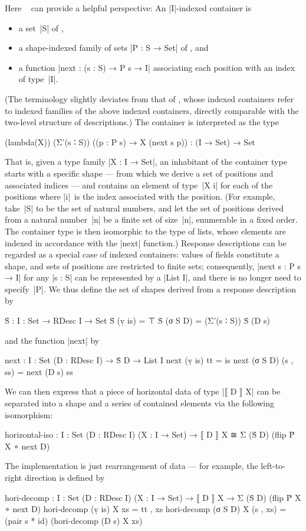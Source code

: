 Here ~\citep[Chapter~8]{Morris-thesis} can provide a helpful perspective:
An |I|-indexed container is
\begin{itemize}
\item a set~|S| of ,
\item a shape-indexed family of sets |P : S → Set| of , and
\item a function |next : (s : S) → P s → I| associating each position with an index of type~|I|.
\end{itemize}
(The terminology slightly deviates from that of \citeauthor{Morris-thesis}, whose indexed containers refer to indexed families of the above indexed containers, directly comparable with the two-level structure of descriptions.)
The container is interpreted as the type
\begin{code}
(lambda(X)) (Σ'(s ∶ S)) ((p : P s) → X (next s p)) : (I → Set) → Set
\end{code}
That is, given a type family |X : I → Set|, an inhabitant of the container type starts with a specific shape --- from which we derive a set of positions and associated indices --- and contains an element of type~|X i| for each of the positions where |i|~is the index associated with the position.
(For example, take~|S| to be the set of natural numbers, and let the set of positions derived from a natural number~|n| be a finite set of size~|n|, enumerable in a fixed order.
The container type is then isomorphic to the type of lists, whose elements are indexed in accordance with the |next| function.)
Response descriptions can be regarded as a special case of indexed containers: values of fields constitute a shape, and sets of positions are restricted to finite sets; consequently, |next s : P s → I| for any |s : S| can be represented by a |List I|, and there is no longer need to specify~|P|.
We thus define the set of shapes derived from a response description by
\begin{code}
Ṡ : {I : Set} → RDesc I → Set
Ṡ (ṿ is)   = ⊤
Ṡ (σ S D)  = (Σ'(s ∶ S)) Ṡ (D s)
\end{code}
and the function |next| by
\begin{code}
next : {I : Set} (D : RDesc I) → Ṡ D → List I
next (ṿ is)   tt        = is
next (σ S D)  (s , ss)  = next (D s) ss
\end{code}
We can then express that a piece of horizontal data of type |⟦ D ⟧ X| can be separated into a shape and a series of contained elements via the following isomorphism:
\begin{code}
horizontal-iso :  {I : Set} (D : RDesc I) (X : I → Set) →
                  ⟦ D ⟧ X ≅ Σ (Ṡ D) (flip Ṗ X ∘ next D)
\end{code}
The implementation is just rearrangement of data --- for example, the left-to-right direction is defined by
\begin{code}
hori-decomp :  {I : Set} (D : RDesc I) (X : I → Set) →
               ⟦ D ⟧ X → Σ (Ṡ D) (flip Ṗ X ∘ next D)
hori-decomp (ṿ is)   X xs        = tt , xs
hori-decomp (σ S D)  X (s , xs)  = (pair s * id) (hori-decomp (D s) X xs)
\end{code}

